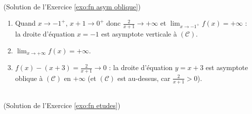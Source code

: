 \begin{corrige}
\begin{sol} ~ \\
(Solution de l'Exercice \ref{exo:fn asym oblique})
\begin{enumerate}
\item Quand $x \to -1^+$, $x + 1 \to 0^+$ donc $\frac{2}{x+1} \to +\infty$ et $\lim_{x\to-1^+} f(x) = +\infty$ :
      la droite d'\'equation $x = -1$ est asymptote verticale \`a $(\mathscr{C})$.
\item $\lim_{x\to+\infty} f(x) = +\infty$.
\item $f(x) - (x + 3) = \frac{2}{x+1} \to 0$ : la droite d'\'equation $y = x + 3$ est asymptote oblique \`a $(\mathscr{C})$ en $+\infty$
      (et $(\mathscr{C})$ est au-dessus, car $\frac{2}{x+1} > 0$).
\end{enumerate}
\end{sol}

\begin{sol} ~ \\
(Solution de l'Exercice \ref{exo:fn etudes})


\end{sol}
\end{corrige}
